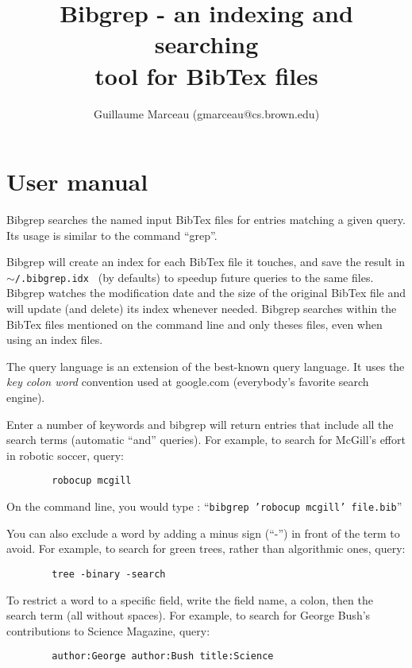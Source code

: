 \documentclass[11pt]{article}
\title{Bibgrep - an indexing and searching \\ tool for BibTex files}
\author{Guillaume Marceau (gmarceau@cs.brown.edu)}
\begin{document}
\maketitle

\section*{User manual}

   Bibgrep searches the named input BibTex files for entries matching
   a given query. Its usage is similar to the command ``grep''.


   Bibgrep will create an index for each BibTex file it touches, and
   save the result in {\tt $\sim$/.bibgrep.idx } (by defaults) to
   speedup future queries to the same files. Bibgrep watches the
   modification date and the size of the original BibTex file and will
   update (and delete) its index whenever needed.  Bibgrep searches
   within the BibTex files mentioned on the command line and only
   theses files, even when using an index files.


   The query language is an extension of the best-known query 
   language. It uses the {\em key colon word} convention used at google.com
   (everybody's favorite search engine).


   Enter a number of keywords and bibgrep will return entries that
   include all the search terms (automatic ``and'' queries). For example,
   to search for McGill's effort in robotic soccer, query:

\begin{verbatim}
        robocup mcgill
\end{verbatim}

   On the command line, you would type : ``{\tt bibgrep 'robocup mcgill'
   file.bib}''

   You can also exclude a word by adding a minus sign (``-'') in front
   of the term to avoid. For example, to search for green trees,
   rather than algorithmic ones, query:


\begin{verbatim}
        tree -binary -search
\end{verbatim}


   To restrict a word to a specific field, write the field name, a colon,
   then the search term (all without spaces). For example, to search for
   George Bush's contributions to Science Magazine, query:


\begin{verbatim}
        author:George author:Bush title:Science
\end{verbatim}
\end{document}
